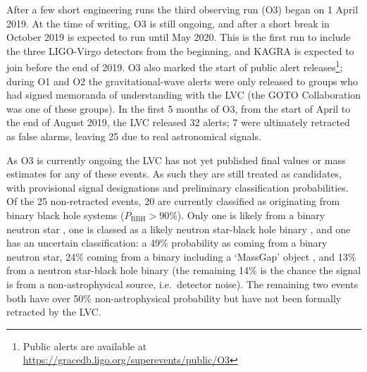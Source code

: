 \begin{colsection}
After a few short engineering runs the third observing run (O3)  began on 1 April 2019. At the time of writing, O3 is still ongoing, and after a short break in October 2019 is expected to run until May 2020. This is the first run to include the three LIGO-Virgo detectors from the beginning, and KAGRA is expected to join before the end of 2019. O3 also marked the start of public alert releases\footnote{Public alerts are available at \url{https://gracedb.ligo.org/superevents/public/O3}}; during O1 and O2 the gravitational-wave alerts were only released to groups who had signed memoranda of understanding with the LVC (the GOTO Collaboration was one of these groups). In the first 5 months of O3, from the start of April to the end of August 2019, the LVC released 32 alerts; 7 were ultimately retracted as false alarms, leaving 25 due to real astronomical signals.

As O3 is currently ongoing the LVC has not yet published final values or mass estimates for any of these events. As such they are still treated as candidates, with provisional signal designations and preliminary classification probabilities. Of the 25 non-retracted events, 20 are currently classified as originating from binary black hole systems ($P_\text{BBH}>90\%$). Only one is likely from a binary neutron star \citep[S190425z;][]{S190425z}, one is classed as a likely neutron star-black hole binary \citep[S190814bv;][]{S190814bv}, and one \citep[S190426c;][]{S190426c} has an uncertain classification: a 49\% probability as coming from a binary neutron star, 24\% coming from a binary including a `MassGap' object \citep[a theorised object with a mass between a neutron star and a black hole;][]{GW_MassGap}, and 13\% from a neutron star-black hole binary (the remaining 14\% is the chance the signal is from a non-astrophysical source, i.e.\ detector noise). The remaining two events both have over 50\% non-astrophysical probability but have not been formally retracted by the LVC.\@

\end{colsection}


